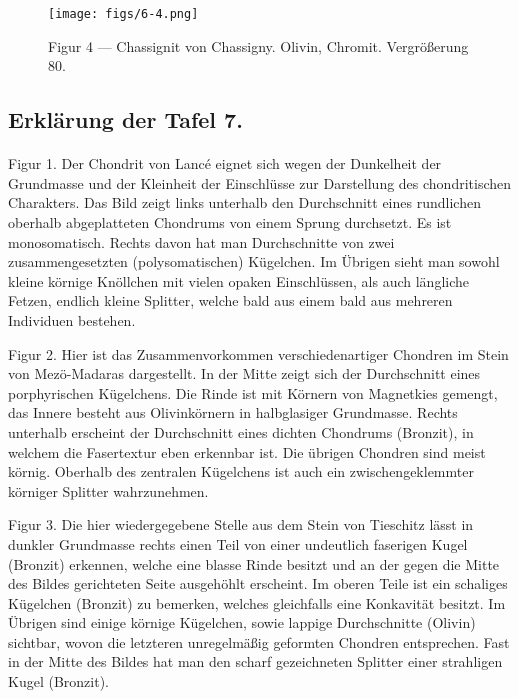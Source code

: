 \documentclass[a4paper, 12pt, oneside]{article}
\begin{document}
\vspace*{\fill}
\begin{figure}[H]
\centering
\texttt{[image: figs/6-4.png]}
\caption{\small Figur 4 --- Chassignit von Chassigny. Olivin, Chromit. Vergrößerung 80.}
\end{figure}
\vspace*{\fill}
\clearpage

\subsection{Erklärung der Tafel 7.}
\paragraph{}
Figur 1. Der Chondrit von Lancé eignet sich wegen der Dunkelheit der Grundmasse und der Kleinheit der Einschlüsse zur Darstellung des chondritischen Charakters. Das Bild zeigt links unterhalb den Durchschnitt eines rundlichen oberhalb abgeplatteten Chondrums von einem Sprung durchsetzt. Es ist monosomatisch. Rechts davon hat man Durchschnitte von zwei zusammengesetzten (polysomatischen) Kügelchen. Im Übrigen sieht man sowohl kleine körnige Knöllchen mit vielen opaken Einschlüssen, als auch längliche Fetzen, endlich kleine Splitter, welche bald aus einem bald aus mehreren Individuen bestehen.

Figur 2. Hier ist das Zusammenvorkommen verschiedenartiger Chondren im Stein von Mezö-Madaras dargestellt. In der Mitte zeigt sich der Durchschnitt eines porphyrischen Kügelchens. Die Rinde ist mit Körnern von Magnetkies gemengt, das Innere besteht aus Olivinkörnern in halbglasiger Grundmasse. Rechts unterhalb erscheint der Durchschnitt eines dichten Chondrums (Bronzit), in welchem die Fasertextur eben erkennbar ist. Die übrigen Chondren sind meist körnig. Oberhalb des zentralen Kügelchens ist auch ein zwischengeklemmter körniger Splitter wahrzunehmen.

Figur 3. Die hier wiedergegebene Stelle aus dem Stein von Tieschitz lässt in dunkler Grundmasse rechts einen Teil von einer undeutlich faserigen Kugel (Bronzit) erkennen, welche eine blasse Rinde besitzt und an der gegen die Mitte des Bildes gerichteten Seite ausgehöhlt erscheint. Im oberen Teile ist ein schaliges Kügelchen (Bronzit) zu bemerken, welches gleichfalls eine Konkavität besitzt. Im Übrigen sind einige körnige Kügelchen, sowie lappige Durchschnitte (Olivin) sichtbar, wovon die letzteren unregelmäßig geformten Chondren entsprechen. Fast in der Mitte des Bildes hat man den scharf gezeichneten Splitter einer strahligen Kugel (Bronzit).
\end{document}
